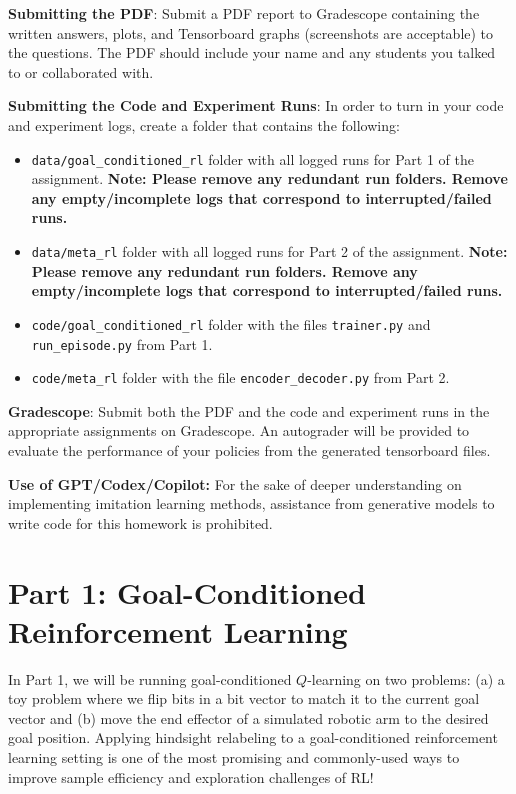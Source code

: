 \documentclass[12pt]{article}
\begin{document}
\vspace{0.2cm}
\noindent\textbf{Submitting the PDF}: Submit a PDF report to Gradescope containing the written answers, plots, and Tensorboard graphs (screenshots are acceptable) to the questions. The PDF should include your name and any students you talked to or collaborated with.

\vspace{0.2cm}

\noindent\textbf{Submitting the Code and Experiment Runs}: In order to turn in your code and experiment logs, create a folder that contains the following:
\begin{itemize}
\item \texttt{data/goal\_conditioned\_rl} folder with all logged runs for Part 1 of the assignment. \textbf{Note: Please remove any redundant run folders. Remove any empty/incomplete logs that correspond to interrupted/failed runs.}

\item \texttt{data/meta\_rl} folder with all logged runs for Part 2 of the assignment. \textbf{Note: Please remove any redundant run folders. Remove any empty/incomplete logs that correspond to interrupted/failed runs.}

\item \texttt{code/goal\_conditioned\_rl} folder with the files \texttt{trainer.py} and \texttt{run\_episode.py} from Part 1.

\item \texttt{code/meta\_rl} folder with the file \texttt{encoder\_decoder.py} from Part 2.
\end{itemize} 

\noindent\textbf{Gradescope}: Submit both the PDF and the code and experiment runs in the appropriate assignments on Gradescope. An autograder will be provided to evaluate the performance of your policies from the generated tensorboard files. 

\noindent\textbf{Use of GPT/Codex/Copilot:} For the sake of deeper understanding on implementing imitation learning methods, assistance from generative models to write code for this homework is prohibited. 

\newpage
\section*{Part 1: Goal-Conditioned Reinforcement Learning}

In Part 1, we will be running goal-conditioned $Q$-learning on two problems: (a) a toy problem where we flip bits in a bit vector to match it to the current goal vector and (b) move the end effector of a simulated robotic arm to the desired goal position. Applying hindsight relabeling to a goal-conditioned reinforcement learning setting is one of the most promising and commonly-used ways to improve sample efficiency and exploration challenges of RL!
\end{document}
